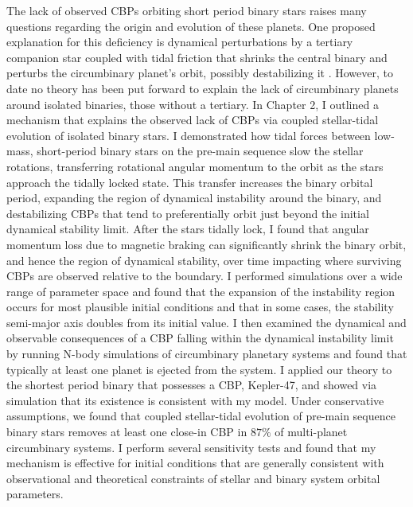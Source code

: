 The lack of observed CBPs orbiting short period binary stars raises many questions regarding the origin and evolution of these planets.  One proposed explanation for this deficiency is dynamical perturbations by a tertiary companion star coupled with tidal friction that shrinks the central binary and perturbs the circumbinary planet's orbit, possibly destabilizing it \citep{Munoz2015,Martin2015b,Hamers2016}.  However, to date no theory has been put forward to explain the lack of circumbinary planets around isolated binaries, those without a tertiary. In Chapter 2, I outlined a mechanism that explains the observed lack of CBPs via coupled stellar-tidal evolution of isolated binary stars. I demonstrated how tidal forces between low-mass, short-period binary stars on the pre-main sequence slow the stellar rotations, transferring rotational angular momentum to the orbit as the stars approach the tidally locked state.  This transfer increases the binary orbital period, expanding the region of dynamical instability around the binary, and destabilizing CBPs that tend to preferentially orbit just beyond the initial dynamical stability limit.  After the stars tidally lock, I found that angular momentum loss due to magnetic braking can significantly shrink the binary orbit, and hence the region of dynamical stability, over time impacting where surviving CBPs are observed relative to the boundary.  I performed simulations over a wide range of parameter space and found that the expansion of the instability region occurs for most plausible initial conditions and that in some cases, the stability semi-major axis doubles from its initial value.  I then examined the dynamical and observable consequences of a CBP falling within the dynamical instability limit by running N-body simulations of circumbinary planetary systems and found that typically at least one planet is ejected from the system.  I applied our theory to the shortest period \kepler binary that possesses a CBP, Kepler-47, and showed via simulation that its existence is consistent with my model.  Under conservative assumptions, we found that coupled stellar-tidal evolution of pre-main sequence binary stars removes at least one close-in CBP in $87\%$ of multi-planet circumbinary systems. I perform several sensitivity tests and found that my mechanism is effective for initial conditions that are generally consistent with observational and theoretical constraints of stellar and binary system orbital parameters. 

